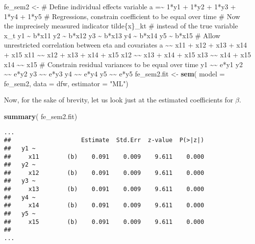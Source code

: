 \documentclass[]{interact}
\theoremstyle{plain}%
\theoremstyle{definition}
\theoremstyle{remark}
\newenvironment{Shaded}{\begin{snugshade}}{\end{snugshade}}
\newcommand{\DataTypeTok}[1]{\textcolor[rgb]{0.13,0.29,0.53}{#1}}
\newcommand{\KeywordTok}[1]{\textcolor[rgb]{0.13,0.29,0.53}{\textbf{#1}}}
\newcommand{\NormalTok}[1]{#1}
\newcommand{\StringTok}[1]{\textcolor[rgb]{0.31,0.60,0.02}{#1}}
\begin{document}
\begin{Shaded}
\begin{Highlighting}[]
\NormalTok{fe\_sem2 \textless{}{-}}\StringTok{ \textquotesingle{}}
\StringTok{\# Define individual effects variable }
\StringTok{a =\textasciitilde{} 1*y1 + 1*y2 + 1*y3 + 1*y4 + 1*y5}
\StringTok{\# Regressions, constrain coefficient to be equal over time}
\StringTok{\# Now the imprecisely measured indicator tilde\{x\}\_kt}
\StringTok{\# instead of the true variable x\_t}
\StringTok{y1 \textasciitilde{} b*x11 }
\StringTok{y2 \textasciitilde{} b*x12 }
\StringTok{y3 \textasciitilde{} b*x13}
\StringTok{y4 \textasciitilde{} b*x14}
\StringTok{y5 \textasciitilde{} b*x15}
\StringTok{\# Allow unrestricted correlation between eta and covariates}
\StringTok{a \textasciitilde{}\textasciitilde{} x11 + x12 + x13 + x14 + x15}
\StringTok{x11 \textasciitilde{}\textasciitilde{} x12 + x13 + x14 + x15}
\StringTok{x12 \textasciitilde{}\textasciitilde{} x13 + x14 + x15}
\StringTok{x13 \textasciitilde{}\textasciitilde{} x14 + x15}
\StringTok{x14 \textasciitilde{}\textasciitilde{} x15}
\StringTok{\# Constrain residual variances to be equal over time}
\StringTok{y1 \textasciitilde{}\textasciitilde{} e*y1}
\StringTok{y2 \textasciitilde{}\textasciitilde{} e*y2}
\StringTok{y3 \textasciitilde{}\textasciitilde{} e*y3}
\StringTok{y4 \textasciitilde{}\textasciitilde{} e*y4}
\StringTok{y5 \textasciitilde{}\textasciitilde{} e*y5}
\StringTok{\textquotesingle{}}
\NormalTok{fe\_sem2.fit \textless{}{-}}\StringTok{ }\KeywordTok{sem}\NormalTok{( }\DataTypeTok{model =}\NormalTok{ fe\_sem2, }
                    \DataTypeTok{data =}\NormalTok{ dfw, }
                    \DataTypeTok{estimator =} \StringTok{"ML"}\NormalTok{)}
\end{Highlighting}
\end{Shaded}

\doublespacing

Now, for the sake of brevity, let us look just at the estimated
coefficients for \(\beta\).

\singlespacing

\begin{Shaded}
\begin{Highlighting}[]
\KeywordTok{summary}\NormalTok{( fe\_sem2.fit)}
\end{Highlighting}
\end{Shaded}

\begin{verbatim}
...
##                    Estimate  Std.Err  z-value  P(>|z|)
##   y1 ~                                                
##     x11        (b)    0.091    0.009    9.611    0.000
##   y2 ~                                                
##     x12        (b)    0.091    0.009    9.611    0.000
##   y3 ~                                                
##     x13        (b)    0.091    0.009    9.611    0.000
##   y4 ~                                                
##     x14        (b)    0.091    0.009    9.611    0.000
##   y5 ~                                                
##     x15        (b)    0.091    0.009    9.611    0.000
## 
...
\end{verbatim}
\end{document}
